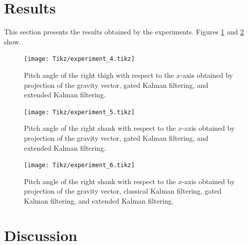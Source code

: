\section{Results}

This section presents the results obtained by the experiments. Figures \ref{fig:experiment_4} and \ref{fig:experiment_5} show.

\begin{figure}
	\centering
	\setlength\figureheight{7cm} 
	\setlength\figurewidth{\textwidth}
	\texttt{[image: Tikz/experiment\_4.tikz]}
	\caption{Pitch angle of the right thigh with respect to the $x$-axis obtained by projection of the gravity vector, gated Kalman filtering, and extended Kalman filtering.}
	\label{fig:experiment_4}
\end{figure}

\begin{figure}
	\centering
	\setlength\figureheight{7cm} 
	\setlength\figurewidth{\textwidth}
	\texttt{[image: Tikz/experiment\_5.tikz]}
	\caption{Pitch angle of the right shank with respect to the $x$-axis obtained by projection of the gravity vector, gated Kalman filtering, and extended Kalman filtering.}
	\label{fig:experiment_5}
\end{figure}

\begin{figure}
	\centering
	\setlength\figureheight{7cm} 
	\setlength\figurewidth{\textwidth}
	\texttt{[image: Tikz/experiment\_6.tikz]}
	\caption{Pitch angle of the right shank with respect to the $x$-axis obtained by projection of the gravity vector, classical Kalman filtering, gated Kalman filtering, and extended Kalman filtering.}
	\label{fig:experiment_6}
\end{figure}

\section{Discussion}

